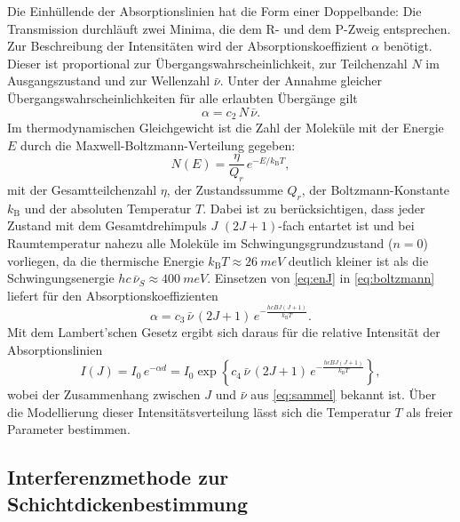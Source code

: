 \documentclass[11pt,a4paper]{article}
\newcommand{\wz}{\ensuremath{\bar{\nu}}}          %
\newcommand{\wzs}{\ensuremath{\bar{\nu}_S}}        %
\newcommand{\kB}{\ensuremath{k_\mathrm{B}}}        %
\begin{document}
Die Einhüllende der Absorptionslinien hat die Form einer Doppelbande: Die
Transmission durchläuft zwei Minima, die dem R- und dem P-Zweig entsprechen. Zur
Beschreibung der Intensitäten wird der Absorptionskoeffizient $\alpha$ benötigt.
Dieser ist proportional zur Übergangswahrscheinlichkeit, zur Teilchenzahl $N$ im
Ausgangszustand und zur Wellenzahl \wz{}. Unter der Annahme gleicher
Übergangswahrscheinlichkeiten für alle erlaubten Übergänge gilt
\begin{equation}
  \alpha = c_2\,N\,\wz .
  \label{eq:alpha}
\end{equation}
Im thermodynamischen Gleichgewicht ist die Zahl der Moleküle mit der Energie $E$
durch die Maxwell-Boltzmann-Verteilung gegeben:
\begin{equation}
  N(E) = \frac{\eta}{Q_r}\,e^{-E/\kB T},
  \label{eq:boltzmann}
\end{equation}
mit der Gesamtteilchenzahl $\eta$, der Zustandssumme $Q_r$, der
Boltzmann-Konstante \kB{} und der absoluten Temperatur $T$. Dabei ist zu
berücksichtigen, dass jeder Zustand mit dem Gesamtdrehimpuls $J$ $(2J+1)$-fach
entartet ist und bei Raumtemperatur nahezu alle Moleküle im
Schwingungsgrundzustand ($n = 0$) vorliegen, da die thermische Energie
$\kB T \approx \SI{26}{meV}$ deutlich kleiner ist als die Schwingungsenergie
$hc\,\wzs \approx \SI{400}{meV}$. Einsetzen von \eqref{eq:enJ} in
\eqref{eq:boltzmann} liefert für den Absorptionskoeffizienten
\begin{equation}
  \alpha = c_3\,\wz\,(2J+1)\,e^{-\frac{hc B J(J+1)}{\kB T}} .
  \label{eq:alphaJ}
\end{equation}
Mit dem Lambert'schen Gesetz ergibt sich daraus für die relative Intensität der
Absorptionslinien
\begin{equation}
  I(J) = I_0\,e^{-\alpha d}
       = I_0\exp\!\left\{ c_4\,\wz\,(2J+1)\,
         e^{-\frac{hc B J(J+1)}{\kB T}} \right\},
  \label{eq:intensitaet}
\end{equation}
wobei der Zusammenhang zwischen $J$ und \wz{} aus \eqref{eq:sammel} bekannt ist.
Über die Modellierung dieser Intensitätsverteilung lässt sich die Temperatur $T$
als freier Parameter bestimmen.

\subsection{Interferenzmethode zur Schichtdickenbestimmung}
\label{sec:interferenz}
\end{document}
